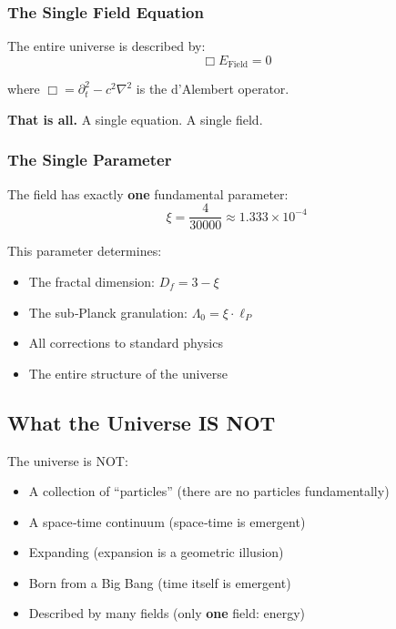 	\subsubsection{The Single Field Equation}
	
	The entire universe is described by:
	\begin{equation}
		\boxed{\Box E_{\text{Field}} = 0}
	\end{equation}
	
	where $\Box = \partial_t^2 - c^2 \nabla^2$ is the d’Alembert operator.
	
	\textbf{That is all.} A single equation. A single field.
	
	\subsubsection{The Single Parameter}
	
	The field has exactly \textbf{one} fundamental parameter:
	\begin{equation}
		\boxed{\xi = \frac{4}{30000} \approx 1.333 \times 10^{-4}}
	\end{equation}
	
	This parameter determines:
	\begin{itemize}
		\item The fractal dimension: $D_f = 3 - \xi$
		\item The sub‑Planck granulation: $\Lambda_0 = \xi \cdot \ell_P$
		\item All corrections to standard physics
		\item The entire structure of the universe
	\end{itemize}
	
	\subsection{What the Universe IS NOT}
	
	\begin{important}
		The universe is NOT:
		\begin{itemize}
			\item A collection of \enquote{particles} (there are no particles fundamentally)
			\item A space‑time continuum (space‑time is emergent)
			\item Expanding (expansion is a geometric illusion)
			\item Born from a Big Bang (time itself is emergent)
			\item Described by many fields (only \textbf{one} field: energy)
		\end{itemize}
	\end{important}
	
